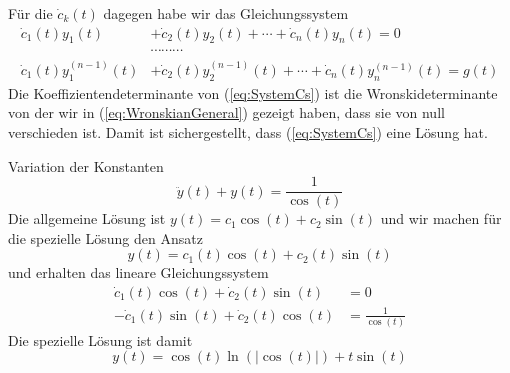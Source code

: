 Für die $\dot{c}_k(t)$ dagegen habe wir das Gleichungssystem
\begin{align}
  \dot{c}_1(t)y_1(t)&+\dot{c}_2(t)y_2(t)+\cdots+\dot{c}_n(t)y_n(t)=0\nonumber\\
	       &\cdots\cdots\cdots\nonumber\\
  \dot{c}_1(t)y^{(n-1)}_1(t)&+\dot{c}_2(t)y^{(n-1)}_2(t)+\cdots
  +\dot{c}_n(t)y^{(n-1)}_n(t)=g(t)
	       \label{eq:SystemCs}
\end{align}
Die Koeffizientendeterminante von (\ref{eq:SystemCs}) ist die
Wronskideterminante von der wir in (\ref{eq:WronskianGeneral}) gezeigt haben,
dass sie von null verschieden ist. Damit ist sichergestellt, dass
(\ref{eq:SystemCs}) eine Lösung hat.
%
\begin{example}{Variation der Konstanten}
  \[\ddot{y}(t)+y(t)=\frac{1}{\cos(t)}\]
  Die allgemeine Lösung ist $y(t)=c_1\cos(t)+c_2\sin(t)$ und wir machen für die
  spezielle Lösung den Ansatz
  \[y(t)=c_1(t)\cos(t)+c_2(t)\sin(t)\]
  und erhalten das lineare Gleichungssystem
  \begin{align*}
    \dot{c}_1(t)\cos(t)+\dot{c}_2(t)\sin(t)&=0\\
    -\dot{c}_1(t)\sin(t)+\dot{c}_2(t)\cos(t)&=\frac{1}{\cos(t)}
  \end{align*}
  Die spezielle Lösung ist damit
  \[y(t)=\cos(t)\ln(|\cos(t)|)+t\sin(t)\]
\end{example}
%
\pagebreak 
